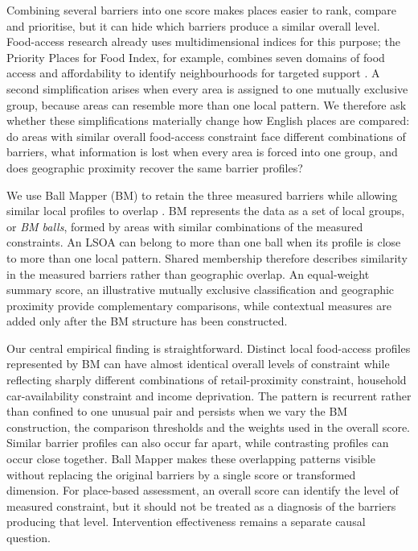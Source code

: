 \documentclass[11pt,a4paper]{article}
\begin{document}
Combining several barriers into one score makes places easier to rank, compare and prioritise, but it can hide which barriers produce a similar overall level. Food-access research already uses multidimensional indices for this purpose; the Priority Places for Food Index, for example, combines seven domains of food access and affordability to identify neighbourhoods for targeted support \citep{Pontin2023}. A second simplification arises when every area is assigned to one mutually exclusive group, because areas can resemble more than one local pattern. We therefore ask whether these simplifications materially change how English places are compared: do areas with similar overall food-access constraint face different combinations of barriers, what information is lost when every area is forced into one group, and does geographic proximity recover the same barrier profiles?

We use Ball Mapper (BM) to retain the three measured barriers while allowing similar local profiles to overlap \citep{Dlotko2019}. BM represents the data as a set of local groups, or \emph{BM balls}, formed by areas with similar combinations of the measured constraints. An LSOA can belong to more than one ball when its profile is close to more than one local pattern. Shared membership therefore describes similarity in the measured barriers rather than geographic overlap. An equal-weight summary score, an illustrative mutually exclusive classification and geographic proximity provide complementary comparisons, while contextual measures are added only after the BM structure has been constructed.

Our central empirical finding is straightforward. Distinct local food-access profiles represented by BM can have almost identical overall levels of constraint while reflecting sharply different combinations of retail-proximity constraint, household car-availability constraint and income deprivation. The pattern is recurrent rather than confined to one unusual pair and persists when we vary the BM construction, the comparison thresholds and the weights used in the overall score. Similar barrier profiles can also occur far apart, while contrasting profiles can occur close together. Ball Mapper makes these overlapping patterns visible without replacing the original barriers by a single score or transformed dimension. For place-based assessment, an overall score can identify the level of measured constraint, but it should not be treated as a diagnosis of the barriers producing that level. Intervention effectiveness remains a separate causal question.
\end{document}
